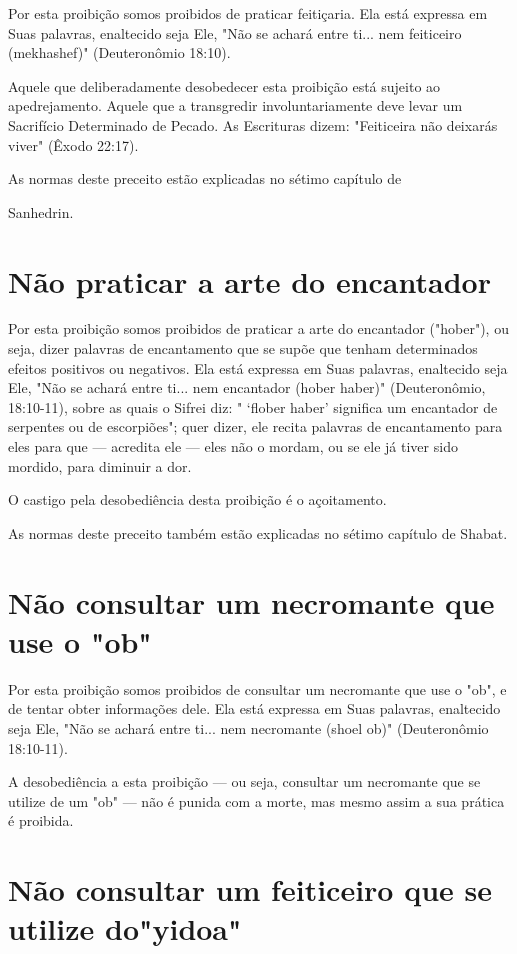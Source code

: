 \begin{itemize}
\begin{enumrate}
\begin{itemize}
\begin{itemize}
\begin{itemize}
Por esta proibição somos proibidos de praticar feitiçaria. Ela está
ex­pressa em Suas palavras, enaltecido seja Ele, "Não se achará entre
ti... nem feiti­ceiro (mekhashef)" (Deuteronômio 18:10).

Aquele que deliberadamente desobedecer esta proibição está sujei­to ao
apedrejamento. Aquele que a transgredir involuntariamente deve levar um
Sacrifício Determinado de Pecado. As Escrituras dizem: "Feiticeira não
dei­xarás viver" (Êxodo 22:17).


As normas deste preceito estão explicadas no sétimo capítulo de


Sanhedrin.

\section{Não praticar a arte do encantador}

Por esta proibição somos proibidos de praticar a arte do encantador
("hober"), ou seja, dizer palavras de encantamento que se supõe que
tenham determinados efeitos positivos ou negativos. Ela está expressa em
Suas pala­vras, enaltecido seja Ele, "Não se achará entre ti... nem
encantador (hober ha­ber)" (Deuteronômio, 18:10-11), sobre as quais o
Sifrei diz: " `flober haber' significa um encantador de serpentes ou de
escorpiões"; quer dizer, ele recita palavras de encantamento para eles
para que --- acredita ele --- eles não o mor­dam, ou se ele já tiver
sido mordido, para diminuir a dor.

O castigo pela desobediência desta proibição é o açoitamento.

As normas deste preceito também estão explicadas no sétimo capí­tulo de
Shabat.

\section{Não consultar um necromante que use o "ob"}

Por esta proibição somos proibidos de consultar um necromante que use o
"ob", e de tentar obter informações dele. Ela está expressa em Suas
pala­vras, enaltecido seja Ele, "Não se achará entre ti... nem
necromante (shoel ob)" (Deuteronômio 18:10-11).

A desobediência a esta proibição --- ou seja, consultar um necromante
que se utilize de um "ob" --- não é punida com a morte, mas mesmo assim
a sua prática é proibida.


\section{Não consultar um feiticeiro que se utilize do"yidoa"}



\end{itemize}
\end{itemize}
\end{itemize}
\end{enumrate}
\end{itemize}
